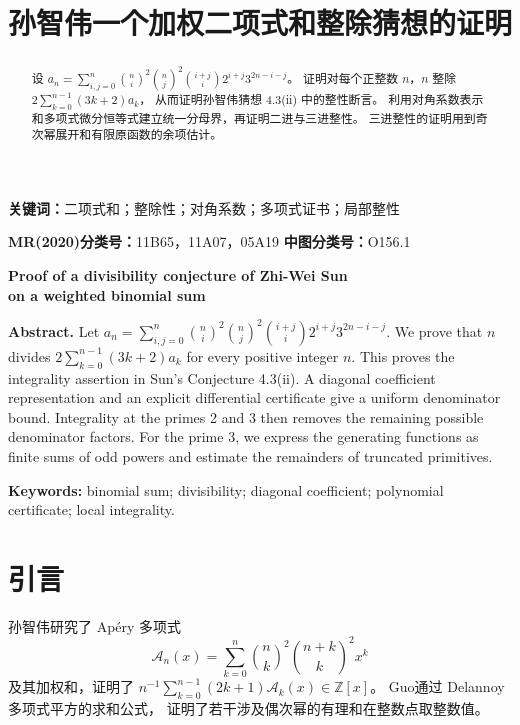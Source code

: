 \documentclass[a4paper,11pt]{article}
\title{\textbf{孙智伟一个加权二项式和整除猜想的证明}}
\author{}
\date{}
\numberwithin{equation}{section}
\theoremstyle{chinese}
\newcommand{\Z}{\mathbb Z}
\begin{document}
\maketitle
\begin{abstract}
设 $a_n=\sum_{i,j=0}^{n}\binom ni^2\binom nj^2\binom{i+j}{i}2^{i+j}3^{2n-i-j}$。
证明对每个正整数 $n$，$n$ 整除 $2\sum_{k=0}^{n-1}(3k+2)a_k$，
从而证明孙智伟猜想 4.3(ii) 中的整性断言。
利用对角系数表示和多项式微分恒等式建立统一分母界，再证明二进与三进整性。
三进整性的证明用到奇次幂展开和有限原函数的余项估计。
\end{abstract}
\noindent\textbf{关键词：}二项式和；整除性；对角系数；多项式证书；局部整性

\noindent\textbf{MR(2020)分类号：}11B65，11A07，05A19\qquad
\textbf{中图分类号：}O156.1

\bigskip
\begin{center}
\textbf{Proof of a divisibility conjecture of Zhi-Wei Sun\\
on a weighted binomial sum}\\[6pt]

\end{center}
\noindent\textbf{Abstract.}
Let $a_n=\sum_{i,j=0}^{n}\binom ni^2\binom nj^2\binom{i+j}{i}2^{i+j}3^{2n-i-j}$.
We prove that $n$ divides $2\sum_{k=0}^{n-1}(3k+2)a_k$ for every positive integer $n$.
This proves the integrality assertion in Sun's Conjecture 4.3(ii).
A diagonal coefficient representation and an explicit differential certificate
give a uniform denominator bound. Integrality at the primes 2 and 3 then removes
the remaining possible denominator factors. For the prime 3, we express the generating functions as finite sums of odd powers
and estimate the remainders of truncated primitives.

\medskip
\noindent\textbf{Keywords:} binomial sum; divisibility; diagonal coefficient;
polynomial certificate; local integrality.

\newpage
\section{引言}
孙智伟\cite{Sun2012}研究了 Apéry 多项式
\[
\mathcal A_n(x)=\sum_{k=0}^n\binom nk^2\binom{n+k}{k}^2x^k
\]
及其加权和，证明了
$n^{-1}\sum_{k=0}^{n-1}(2k+1)\mathcal A_k(x)\in\Z[x]$。
Guo\cite{Guo2016}通过 Delannoy 多项式平方的求和公式，
证明了若干涉及偶次幂的有理和在整数点取整数值。
\end{document}
